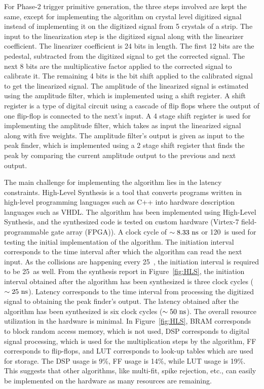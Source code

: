 For Phase-2 trigger primitive generation, the three steps involved are kept the same, except for implementing the algorithm on crystal level digitized signal instead of implementing it on the digitized signal from 5 crystals of a strip. The input to the linearization step is the digitized signal along with the linearizer coefficient. The linearizer coefficient is 24 bits in length. The first 12 bits are the pedestal, subtracted from the digitized signal to get the corrected signal. The next 8 bits are the multiplicative factor applied to the corrected signal to calibrate it. The remaining 4 bits is the bit shift applied to the calibrated signal to get the linearized signal. The amplitude of the linearized signal is estimated using the amplitude filter, which is implemented using a shift register. A shift register is a type of digital circuit using a cascade of flip flops where the output of one flip-flop is connected to the next's input. A 4 stage shift register is used for implementing the amplitude filter, which takes as input the linearized signal along with five weights. The amplitude filter's output is given as input to the peak finder, which is implemented using a 2 stage shift register that finds the peak by comparing the current amplitude output to the previous and next output.

The main challenge for implementing the algorithm lies in the latency constraints. High-Level Synthesis is a tool that converts programs written in high-level programming languages such as C++ into hardware description languages such as VHDL. The algorithm has been implemented using High-Level Synthesis, and the synthesized code is tested on custom hardware (Virtex-7 field-programmable gate array (FPGA)). A clock cycle of $\sim 8.33~\text{ns}$ or 120~\mhz is used for testing the initial implementation of the algorithm. The initiation interval corresponds to the time interval after which the algorithm can read the next input. As the collisions are happening every 25~\ns, the initiation interval is required to be 25~\ns as well. From the synthesis report in Figure~\ref{fig:HLS}, the initiation interval obtained after the algorithm has been synthesized is three clock cycles ($\sim 25~\text{ns}$). Latency corresponds to the time interval from processing the digitized signal to obtaining the peak finder's output. The latency obtained after the algorithm has been synthesized is six clock cycles ($\sim 50~\text{ns}$). The overall resource utilization in the hardware is minimal. In Figure~\ref{fig:HLS}, BRAM corresponds to block random access memory, which is not used, DSP corresponds to digital signal processing, which is used for the multiplication steps by the algorithm, FF corresponds to flip-flops, and LUT corresponds to look-up tables which are used for storage. The DSP usage is 9\%, FF usage is 14\%, while LUT usage is 19\%. This suggests that other algorithms, like multi-fit, spike rejection, etc., can easily be implemented on the hardware as many resources are remaining.

